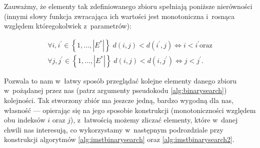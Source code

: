 Zauważmy, że elementy tak zdefiniowanego zbioru spełniają poniższe nierówności (innymi słowy funkcja zwracająca ich wartości jest monotoniczna i~rosnąca względem któregokolwiek z~parametrów):

\begin{gather}\label{eq:ddiffvalues}
	\forall i, i^{\prime} \in \left\{ 1, \dots, \left| E^{\ast} \right| \right\} \; d \left( i, j \right) < d \left( i^{\prime}, j \right) \Leftrightarrow i < i^{\prime}\text{oraz}\\
	\forall j, j^{\prime} \in \left\{ 1, \dots, \left| E^{\ast} \right| \right\} \; d \left( i, j \right) < d \left( i, j^{\prime} \right) \Leftrightarrow j < j^{\prime}\text{.}
\end{gather}

Pozwala to nam w~łatwy sposób przeglądać kolejne elementy danego zbioru w~pożądanej przez nas (patrz argumenty pseudokodu \ref{alg:binarysearch}) kolejności.
Tak stworzony zbiór ma jeszcze jedną, bardzo wygodną dla nas, własność --- opierając się na jego sposobie konstrukcji (monotoniczności względem obu indeksów $i$ oraz $j$), z~łatwością możemy zliczać elementy, które w~danej chwili nas interesują, co wykorzystamy w~następnym podrozdziale przy konstrukcji algorytmów \ref{alg:imstbinarysearch} oraz \ref{alg:imstbinarysearch2}.

